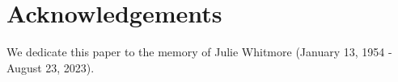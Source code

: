 \documentclass[linenumbers]{aastex63}
\begin{document}
{%






\section*{Acknowledgements}
We dedicate this paper to the memory of Julie Whitmore (January 13, 1954 - August 23, 2023).

}
\end{document}
